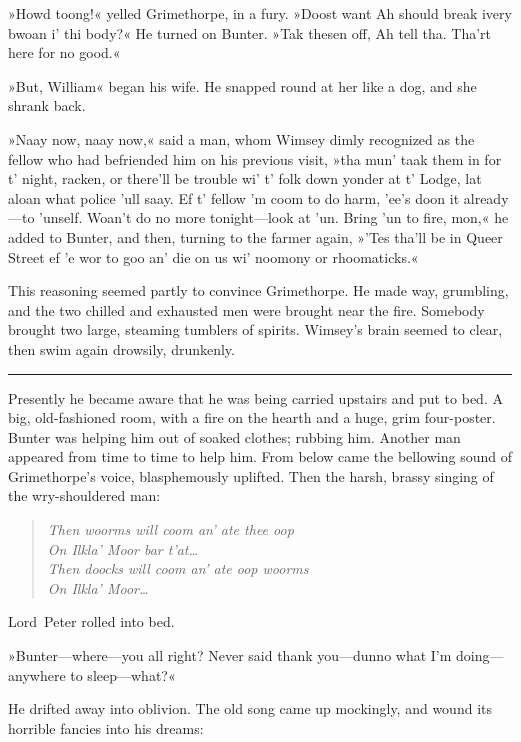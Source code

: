  »Howd toong!« yelled Grimethorpe, in a fury. »Doost want Ah should break ivery bwoan i' thi body?« He turned on Bunter. »Tak thesen off, Ah tell tha. Tha'rt here for no good.«

»But, William\longdash« began his wife. He snapped round at her like a dog, and she shrank back.

»Naay now, naay now,« said a man, whom Wimsey dimly recognized as the fellow who had befriended him on his previous visit, »tha mun' taak them in for t' night, racken, or there'll be trouble wi' t' folk down yonder at t' Lodge, lat aloan what police 'ull saay. Ef t' fellow 'm coom to do harm, 'ee's doon it already—to 'unself. Woan't do no more tonight—look at 'un. Bring 'un to fire, mon,« he added to Bunter, and then, turning to the farmer again, »'Tes tha'll be in Queer Street ef 'e wor to goo an' die on us wi' noomony or rhoomaticks.«

This reasoning seemed partly to convince Grimethorpe. He made way, grumbling, and the two chilled and exhausted men were brought near the fire. Somebody brought two large, steaming tumblers of spirits.  Wimsey's brain seemed to clear, then swim again drowsily, drunkenly. 

\noindent\hfil\rule{0.5\textwidth}{.4pt}\hfil 

Presently he became aware that he was being carried upstairs and put to bed. A big, old-fashioned room, with a fire on the hearth and a huge, grim four-poster. Bunter was helping him out of soaked clothes; rubbing him. Another man appeared from time to time to help him. From below came the bellowing sound of Grimethorpe's voice, blasphemously uplifted. Then the harsh, brassy singing of the wry-shouldered man: 

\clearpage

\begin{quote}\itshape
Then woorms will coom an' ate thee oop\\
On Ilkla' Moor bar t'at\dots\\
Then doocks will coom an' ate oop woorms\\
On Ilkla' Moor\dots\\
\end{quote}


Lord~Peter rolled into bed.

»Bunter—where—you all right? Never said thank you—dunno what I'm doing—anywhere to sleep—what?«

He drifted away into oblivion. The old song came up mockingly, and wound its horrible fancies into his dreams: 

